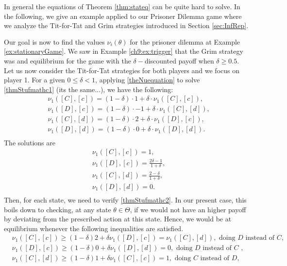 In general the equations of Theorem \ref{thm:stateq} can be quite hard to solve. In the following, we give an example applied to our Prisoner Dilemma game where we analyze the Tit-for-Tat and Grim strategies introduced in Section \ref{sec:InfRep}.

\begin{example}
Our goal is now to find the values $\nu_i(\theta)$ for the prisoner dilemma at Example \ref{ex:stationaryGame}.
We saw in Example \ref{ch9:ex:trigger} that the Grim strategy was and equilibrium for the game with the $\delta-$discounted payoff when $\delta \geq 0.5$.
Let us now consider the Tit-for-Tat strategies for both players and we focus on player 1.
For a given $0 \leq \delta < 1$, applying \eqref{theNuequation} to solve \eqref{thmStufmathc1} (its the same...), we have the following:
$$
\begin{aligned}
& \nu_1([C],[c]) = (1-\delta) \cdot 1 + \delta \cdot \nu_1([C],[c]), \\
& \nu_1([D],[c]) = (1-\delta) \cdot -1 + \delta \cdot \nu_1([C],[d]), \\
& \nu_1([C],[d]) = (1-\delta) \cdot 2 + \delta \cdot \nu_1([D],[c]), \\
& \nu_1([D],[d]) = (1-\delta) \cdot 0 + \delta \cdot \nu_1([D],[d]). \\
\end{aligned}
$$
The solutions are
$$
\begin{aligned}
& \nu_1([C],[c]) =  1 , \\
& \nu_1([D],[c]) = \frac{2\delta - 1}{1+\delta}, \\
& \nu_1([C],[d]) = \frac{2- \delta}{1+\delta}, \\
& \nu_1([D],[d]) = 0. \\
\end{aligned}
$$
Then, for each state, we need to verify \eqref{thmStufmathc2}. In our present case, this boils down to checking, at any state $\theta \in \Theta$, if we would not have an higher payoff by deviating from the prescribed action at this state. Hence, we would be at equilibrium whenever the following inequalities are satisfied.
$$
\begin{aligned}
& \nu_1([C],[c])  \geq (1-\delta) 2 + \delta\nu_1([D],[c]) = \nu_1([C],[d]) , \text{ doing $D$ instead of $C$,}\\
& \nu_1([D],[c])  \geq (1-\delta) 0 + \delta \nu_1([D],[d]) = 0,  \text{ doing $D$ instead of $C$ , }\\
& \nu_1([C],[d])  \geq (1-\delta) 1 + \delta \nu_1([C],[c]) = 1, \text{ doing $C$ instead of $D$, } \\

\end{aligned}$$
\end{example}

